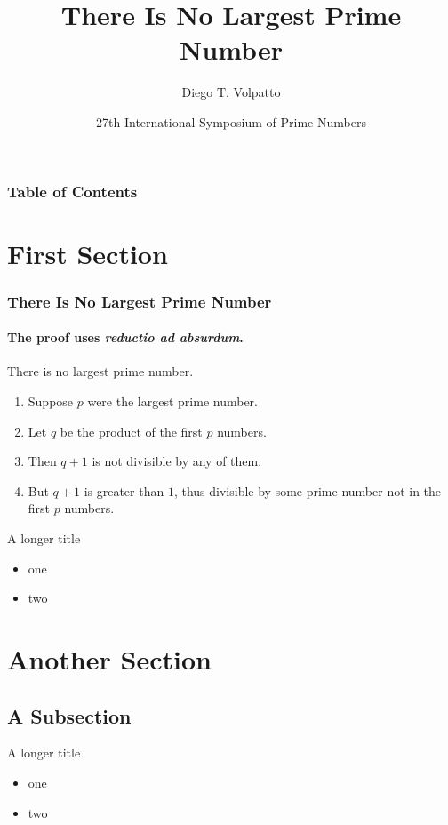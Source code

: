 \documentclass{beamer}
\title{There Is No Largest Prime Number}
\date[ISPN ’80]{27th International Symposium of Prime Numbers}
\author[Diego T. Volpatto]{
				Diego T. Volpatto\inst{1}
				}
\institute[LNCC] %
{
\inst{1} Laboratório Nacional de Computação Científica %
}
\begin{document}
\begin{frame}
\titlepage
\end{frame}

\begin{frame}
\frametitle{Table of Contents} %
\tableofcontents %
\end{frame}

\section{First Section}

\begin{frame} 
\frametitle{There Is No Largest Prime Number} 
\framesubtitle{The proof uses \textit{reductio ad absurdum}.} 
\begin{theorem}
There is no largest prime number. \end{theorem} 
\begin{enumerate} 
\item<1-| alert@1> Suppose $p$ were the largest prime number. 
\item<2-> Let $q$ be the product of the first $p$ numbers. 
\item<3-> Then $q+1$ is not divisible by any of them. 
\item<1-> But $q + 1$ is greater than $1$, thus divisible by some prime
number not in the first $p$ numbers.
\end{enumerate}
\end{frame}

\begin{frame}{A longer title}
\begin{itemize}
\item one
\item two
\end{itemize}
\end{frame}

\section{Another Section}
\subsection{A Subsection}

\begin{frame}{A longer title}
\begin{itemize}
\item one
\item two
\end{itemize}
\end{frame}
\end{document}
